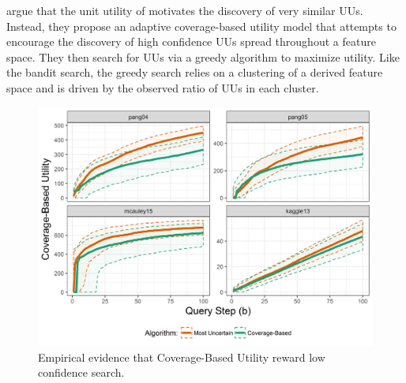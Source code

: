 \documentclass[letterpaper]{article} %
\begin{document}
\citet{Bansal2018} argue that the unit utility of \citet{Lakkaraju2016} motivates the discovery of very similar UUs. Instead, they propose an adaptive coverage-based utility model that attempts to encourage the discovery of high confidence UUs spread throughout a feature space. They then search for UUs via a greedy algorithm to maximize utility.  Like the bandit search, the greedy search relies on a clustering of a derived feature space and is driven by the observed ratio of UUs in each cluster. 


\begin{figure}[h!]
  \centering
  \includegraphics[width=\textwidth]{../experimentsAndPlots/CoverageVsMostUncertainPlaceholder.png}
  \caption{Empirical evidence that Coverage-Based Utility reward low confidence search.}
  \label{fig:coverutil}
\end{figure}
\end{document}
